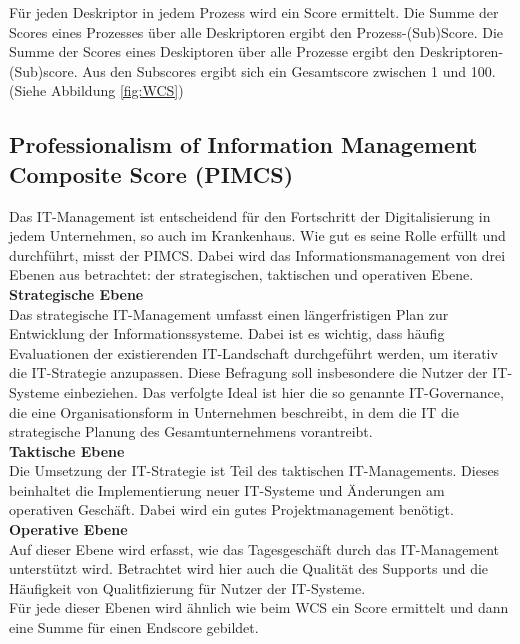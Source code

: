 	Für jeden Deskriptor in jedem Prozess wird ein Score ermittelt. Die Summe der Scores eines Prozesses über alle Deskriptoren ergibt den Prozess-(Sub)Score. Die Summe der Scores eines Deskiptoren über alle Prozesse ergibt den Deskriptoren-(Sub)score. Aus den Subscores ergibt sich ein Gesamtscore zwischen 1 und 100. (Siehe Abbildung \ref{fig:WCS})
\subsection{Professionalism of Information Management Composite Score (PIMCS)}
	Das IT-Management ist entscheidend für den Fortschritt der Digitalisierung in jedem Unternehmen, so auch im Krankenhaus. Wie gut es seine Rolle erfüllt und durchführt, misst der PIMCS. Dabei wird das Informationsmanagement von drei Ebenen aus betrachtet: der strategischen, taktischen und operativen Ebene. \parencite{huebner2019}
	\vspace{\parheadvspace}\\
	\textbf{Strategische Ebene}\\
	Das strategische IT-Management umfasst einen längerfristigen Plan zur Entwicklung der Informationssysteme. Dabei ist es wichtig, dass häufig Evaluationen der existierenden IT-Landschaft durchgeführt werden, um iterativ die IT-Strategie anzupassen. Diese Befragung soll insbesondere die Nutzer der IT-Systeme einbeziehen. Das verfolgte Ideal ist hier die so genannte IT-Governance, die eine Organisationsform in Unternehmen beschreibt, in dem die IT die strategische Planung des Gesamtunternehmens vorantreibt.
	\vspace{\parheadvspace}\\
	\textbf{Taktische Ebene}\\
	Die Umsetzung der IT-Strategie ist Teil des taktischen IT-Managements. Dieses beinhaltet die Implementierung neuer IT-Systeme und Änderungen am operativen Geschäft. Dabei wird ein gutes Projektmanagement benötigt.
	\vspace{\parheadvspace}\\
	\textbf{Operative Ebene}\\
	Auf dieser Ebene wird erfasst, wie das Tagesgeschäft durch das IT-Management unterstützt wird. Betrachtet wird hier auch die Qualität des Supports und die Häufigkeit von Qualitfizierung für Nutzer der IT-Systeme.\\

	Für jede dieser Ebenen wird ähnlich wie beim WCS ein Score ermittelt und dann eine Summe für einen Endscore gebildet. \parencite{huebner2019}

